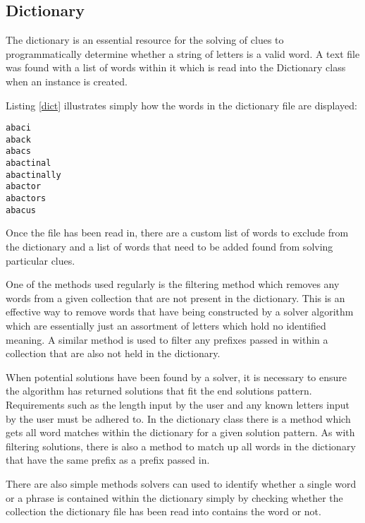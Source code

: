 \subsection{Dictionary}

The dictionary is an essential resource for the solving of clues to 
programmatically determine whether a string of letters is a valid word. 
A text file was found with a list of words within it which is read into the 
Dictionary class when an instance is created.

Listing \ref{dict} illustrates simply how the words in the dictionary file are
displayed:

\begin{lstlisting}[caption={A sample of the dictionary file},
                   label=dict]  
abaci
aback
abacs
abactinal
abactinally
abactor
abactors
abacus
\end{lstlisting}

Once the file has been read in, there are a custom list of words to 
exclude from the dictionary and a list of words that need to be added 
found from solving particular clues. 

One of the methods used regularly is the filtering method which removes any
 words from a given collection that are not present in the dictionary. This is an
 effective way to remove words that have being constructed by a solver algorithm
 which are essentially just an assortment of letters which hold no identified meaning.
 A similar method is used to filter any prefixes passed in within a collection that are 
also not held in the dictionary.

When potential solutions have been found by a solver, it is necessary to ensure 
the algorithm has returned solutions that fit the end solutions pattern. Requirements 
such as the length input by the user and any known letters input by the user must 
be adhered to. In the dictionary class there is a method which gets all word matches 
within the dictionary for a given solution pattern. As with filtering solutions, there is 
also a method to match up all words in the dictionary that have the same prefix as 
a prefix passed in.

There are also simple methods solvers can used to identify whether a single word or a
 phrase is contained within the dictionary simply by checking whether the collection the 
dictionary file has been read into contains the word or not. 

